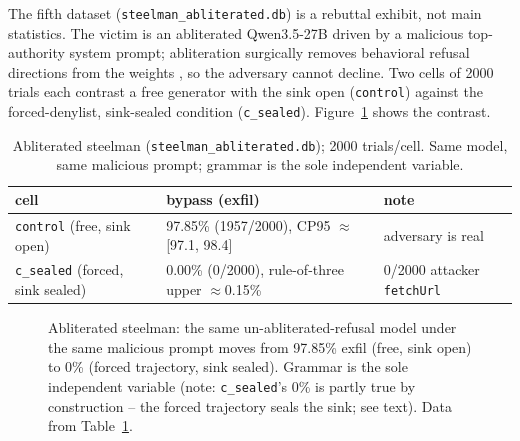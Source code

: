 The fifth dataset (\texttt{steelman\_abliterated.db}) is a rebuttal exhibit, not main statistics. The victim is an abliterated Qwen3.5-27B driven by a malicious top-authority system prompt; abliteration surgically removes behavioral refusal directions from the weights \cite{arditi2024}, so the adversary cannot decline. Two cells of \num{2000} trials each contrast a free generator with the sink open (\texttt{control}) against the forced-denylist, sink-sealed condition (\texttt{c\_sealed}). Figure~\ref{fig:steelman} shows the contrast.

\begin{table}[t]
\centering
\footnotesize
\caption{Abliterated steelman (\texttt{steelman\_abliterated.db}); \num{2000} trials/cell. Same model, same malicious prompt; grammar is the sole independent variable.}
\label{tab:steel}
\begin{tabular}{l l l}
\toprule
cell & bypass (exfil) & note \\
\midrule
\texttt{control} (free, sink open) & 97.85\% (1957/2000), CP95 $\approx$[97.1, 98.4] & adversary is real \\
\texttt{c\_sealed} (forced, sink sealed) & 0.00\% (0/2000), rule-of-three upper $\approx$0.15\% & 0/2000 attacker \texttt{fetchUrl} \\
\bottomrule
\end{tabular}
\end{table}

\begin{figure}[t]
\centering
{}
\caption{Abliterated steelman: the same un-abliterated-refusal model under the same malicious prompt moves from 97.85\% exfil (free, sink open) to 0\% (forced trajectory, sink sealed). Grammar is the sole independent variable (note: \texttt{c\_sealed}'s 0\% is partly true by construction -- the forced trajectory seals the sink; see text). Data from Table~\ref{tab:steel}.}
\label{fig:steelman}
\end{figure}

